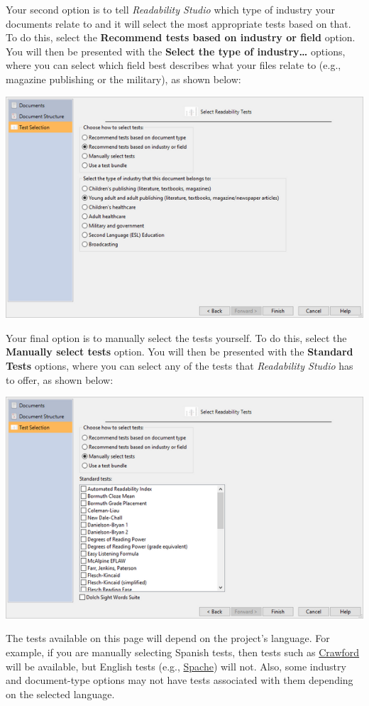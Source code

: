 \documentclass[
]{book}
\theoremstyle{definition}
\theoremstyle{definition}
\theoremstyle{definition}
\theoremstyle{definition}
\theoremstyle{remark}
\begin{document}
Your second option is to tell \emph{Readability Studio} which type of industry your documents relate to and it will select the most appropriate tests based on that. To do this, select the \textbf{Recommend tests based on industry or field} option. You will then be presented with the \textbf{Select the type of industry\ldots{}} options, where you can select which field best describes what your files relate to (e.g., magazine publishing or the military), as shown below:

\includegraphics{Images/wizardbatchindustry.png}

Your final option is to manually select the tests yourself. To do this, select the \textbf{Manually select tests} option. You will then be presented with the \textbf{Standard Tests} options, where you can select any of the tests that \emph{Readability Studio} has to offer, as shown below:

\includegraphics{Images/wizardbatchtests.png}

The tests available on this page will depend on the project's language. For example, if you are manually selecting Spanish tests, then tests such as \protect\hyperlink{crawford}{Crawford} will be available, but English tests (e.g., \protect\hyperlink{spache-test}{Spache}) will not. Also, some industry and document-type options may not have tests associated with them depending on the selected language.
\end{document}
